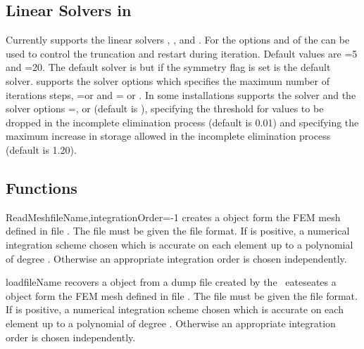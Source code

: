 \subsection{Linear Solvers in \LinearPDE}
Currently \finley supports the linear solvers \PCG, \GMRES, \PRESTWENTY and \BiCGStab. 
For \GMRES the options  and  of the  can be
used to control the truncation and restart during iteration. Default values are
=5 and =20.
The default solver is \BiCGStab  but if the symmetry flag is set \PCG is the default solver.
\finley supports the solver options  which specifies the maximum number of iterations steps,
=\True or \False and = or .
In some installations \finley supports the \Direct solver and the
solver options =, 
 or  (default is ),
 specifying the threshold for values to be dropped in the 
incomplete elimination process (default is 0.01) and  specifying the maximum increase 
in storage allowed in the 
incomplete elimination process (default is 1.20).

\subsection{Functions}
\begin{funcdesc}{ReadMesh}{fileName,integrationOrder=-1}
creates a \Domain object form the FEM mesh defined in 
file . The file must be given the \finley file format.
If  is positive, a numerical integration scheme
chosen which is accurate on each element up to a polynomial of
degree  . Otherwise
an appropriate integration order is chosen independently.
\end{funcdesc}

\begin{funcdesc}{load}{fileName}
recovers a \Domain object from a dump file created by the \ 
eateseates a \Domain object form the FEM mesh defined in 
file . The file must be given the \finley file format.
If \var{integrationOrder} is positive, a numerical integration scheme
chosen which is accurate on each element up to a polynomial of
degree  . Otherwise
an appropriate integration order is chosen independently.
\end{funcdesc}

